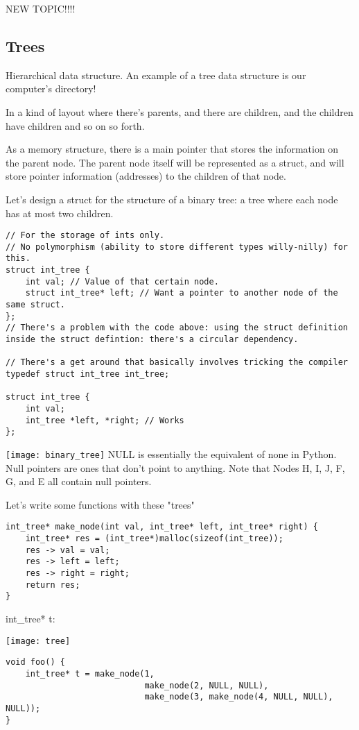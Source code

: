 \documentclass[12pt]{article}
\theoremstyle{definition}
\begin{document}
NEW TOPIC!!!!
\subsection{Trees}
Hierarchical data structure. An example of a tree data structure is our computer's directory!

In a kind of layout where there's parents, and there are children, and the children have children and so on so forth. 

As a memory structure, there is a main pointer that stores the information on the parent node. The parent node itself will be represented as a struct, and will store pointer information (addresses) to the children of that node. 

Let's design a struct for the structure of a binary tree: a tree where each node has at most two children.
\begin{lstlisting}
// For the storage of ints only.
// No polymorphism (ability to store different types willy-nilly) for this.
struct int_tree {
    int val; // Value of that certain node. 
    struct int_tree* left; // Want a pointer to another node of the same struct.
};
// There's a problem with the code above: using the struct definition inside the struct defintion: there's a circular dependency.

// There's a get around that basically involves tricking the compiler
typedef struct int_tree int_tree;

struct int_tree {
    int val; 
    int_tree *left, *right; // Works
};
\end{lstlisting}
\texttt{[image: binary\_tree]}
NULL is essentially the equivalent of none in Python. Null pointers are ones that don't point to anything. Note that Nodes H, I, J, F, G, and E all contain null pointers. 

Let's write some functions with these "trees"
\begin{lstlisting}
int_tree* make_node(int val, int_tree* left, int_tree* right) {
    int_tree* res = (int_tree*)malloc(sizeof(int_tree));
    res -> val = val;
    res -> left = left;
    res -> right = right;
    return res;
}
\end{lstlisting}

int\_tree* t:
\begin{center}
\texttt{[image: tree]}
\end{center}
\begin{lstlisting}
void foo() {
    int_tree* t = make_node(1, 
                            make_node(2, NULL, NULL), 
                            make_node(3, make_node(4, NULL, NULL), NULL));
}
\end{lstlisting}
\end{document}
